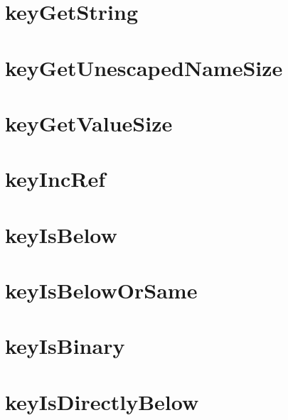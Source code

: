 \let\mypdfximage\pdfximage\def\pdfximage{\immediate\mypdfximage}\documentclass[twoside]{book}
\newcommand{\+}{\discretionary{\mbox{\scriptsize$\hookleftarrow$}}{}{}}
\begin{document}
\chapter{key\+Get\+String}
\label{doc_contrib_api_reviews_core_keyGetString_md}

\chapter{key\+Get\+Unescaped\+Name\+Size}
\label{doc_contrib_api_reviews_core_keyGetUnescapedNameSize_md}

\chapter{key\+Get\+Value\+Size}
\label{doc_contrib_api_reviews_core_keyGetValueSize_md}

\chapter{key\+Inc\+Ref}
\label{doc_contrib_api_reviews_core_keyIncRef_md}

\chapter{key\+Is\+Below}
\label{doc_contrib_api_reviews_core_keyIsBelow_md}

\chapter{key\+Is\+Below\+Or\+Same}
\label{doc_contrib_api_reviews_core_keyIsBelowOrSame_md}

\chapter{key\+Is\+Binary}
\label{doc_contrib_api_reviews_core_keyIsBinary_md}

\chapter{key\+Is\+Directly\+Below}
\label{doc_contrib_api_reviews_core_keyIsDirectlyBelow_md}

\end{document}
